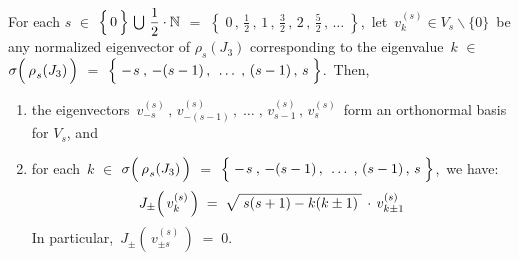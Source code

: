 \begin{theorem}
\begin{enumerate}
	For each
	$s$
	$\in$ $\left\{\,\overset{{\color{white}.}}{0}\,\right\} \,\bigcup\, \dfrac{1}{2} \cdot \N$
	$=$ $\left\{\; 0 \,,\, \frac{1}{2}\,,\, 1\,,\, \frac{3}{2}\,,\, 2\,,\, \frac{5}{2}\,,\, \ldots \;\right\}$,\,
	let \,$v^{(s)}_{k} \in V_{s}\backslash\{0\}$\, be any normalized eigenvector
	of $\rho_{s}(J_{3})$ corresponding to the eigenvalue
	\,$k$ $\in$ $\sigma\!\left(\,\overset{{\color{white}-}}{\rho}_{s}(J_{3})\,\right)$
	$=$ $\left\{\;-\overset{{\color{white}-}}{s} \,,\, -(s-1) \,,\, \;\ldots\;,\, (s-1) \,,\, s\;\right\}$.\,
	Then, 
	\begin{enumerate}
	\item
		the eigenvectors
		\,$v^{(s)}_{-s} \,,\, v^{(s)}_{-(s-1)} \,,\; \ldots \;,\, v^{(s)}_{s-1} \,,\, v^{(s)}_{s}$\,
		form an orthonormal basis for $V_{s}$, and
	\item
		for each \,$k$ $\in$ $\sigma\!\left(\,\overset{{\color{white}-}}{\rho}_{s}(J_{3})\,\right)$
		$=$ $\left\{\;-\overset{{\color{white}-}}{s} \,,\, -(s-1) \,,\, \;\ldots\;,\, (s-1) \,,\, s\;\right\}$,\,
		we have:
		\begin{equation*}
		J_{\pm}\!\left(\,v^{(s)}_{k}\,\right)
		\; = \;
			\sqrt{{\color{white}.}
			s(s+1) - k(k \pm 1)
			{\color{white}.}}
			\,\cdot\,
			v^{(s)}_{k \pm 1}
		\end{equation*}
		In particular, \,$J_{\pm}\!\left(\,v^{(s)}_{\pm s}\,\right) \; = \; 0$.
	\end{enumerate}
\end{enumerate}
\end{theorem}


